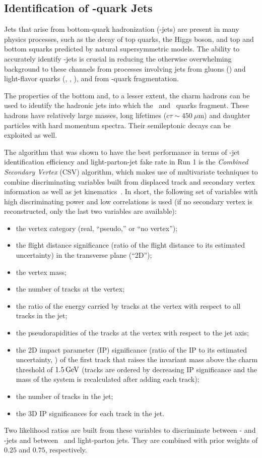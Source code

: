 \subsection{Identification of \PQb-quark Jets}

Jets that arise from bottom-quark hadronization (\cPqb-jets) are
present in many physics processes, such as the decay of top quarks,
the Higgs boson, and top and bottom squarks predicted by natural supersymmetric models. 
The ability to accurately identify \cPqb-jets is crucial in reducing
the otherwise overwhelming background to these channels from processes
involving jets from gluons (\cPg) and light-flavor quarks (\cPqu,
\cPqd, \cPqs), and from \cPqc-quark fragmentation. 

The properties of the bottom and, to a lesser extent, the charm
hadrons can be used to identify the hadronic jets into which the
\cPqb\ and \cPqc\ quarks fragment.  These hadrons have relatively
large masses, long lifetimes ($c\tau\sim 450~\mu\mathrm{m}$) and daughter particles with hard momentum
spectra. Their semileptonic decays can be exploited as well. 

The algorithm that was shown to have the best performance
in terms of \cPqb-jet identification efficiency and light-parton-jet fake rate
in Run 1 is the \emph{Combined Secondary Vertex} (CSV)
algorithm, which makes use of multivariate techniques to combine
discriminating variables built from displaced track and secondary
vertex information as well as jet
kinematics~\cite{btag7TeV,btag8TeV}. In short, the following set of
variables with high discriminating power and low correlations is used
(if no secondary vertex is reconstructed, only the last two variables are available): 
\begin{itemize}
\item the vertex category (real, ``pseudo,'' or ``no vertex'');
\item the flight distance significance (ratio of the flight
  distance to its estimated uncertainty) in the transverse plane (``2D'');
\item the vertex mass;
\item the number of tracks at the vertex;
\item the ratio of the energy carried by tracks at the vertex with respect to all tracks in the jet;
\item the pseudorapidities of the tracks at the vertex with respect to the jet axis;
\item the 2D impact parameter (IP) significance (ratio of the IP to its estimated uncertainty, ) of the first track that raises the invariant mass above the charm threshold of $1.5 \,\text{Ge\hspace{-.08em}V}$ (tracks are ordered by decreasing IP significance and the mass of the system is recalculated after adding each track);
\item the number of tracks in the jet;
\item the 3D IP significances for each track in the jet.
\end{itemize}
Two likelihood ratios are built from these variables to
discriminate between \cPqb-  and \cPqc-jets and between \cPqb\ and
light-parton jets. They are combined with prior weights of $0.25$ and $0.75$, respectively.

